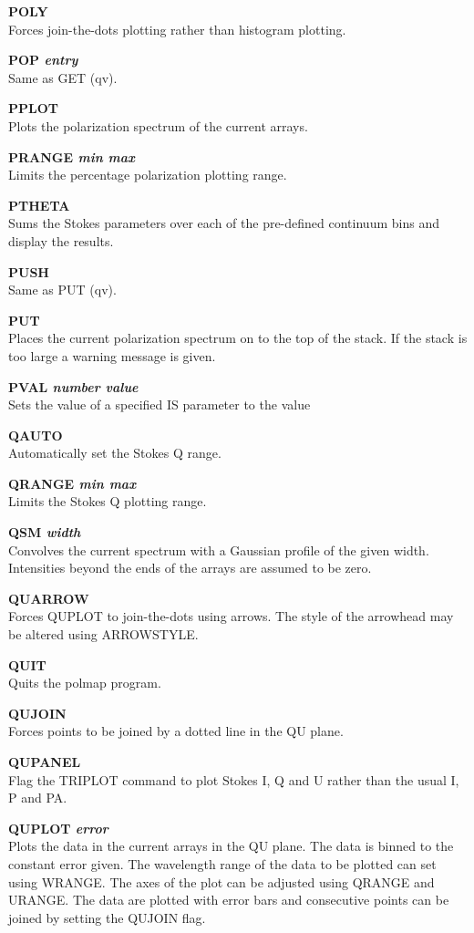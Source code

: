 {\bf POLY} \\
Forces join-the-dots plotting rather than histogram plotting.

{\bf POP \it  entry} \\
Same as GET (qv).

{\bf PPLOT} \\
Plots the polarization spectrum of the current arrays.

{\bf PRANGE \it min max } \\
Limits the percentage polarization plotting range.

{\bf PTHETA} \\
Sums the Stokes parameters over each of the pre-defined continuum bins and
display the results.

{\bf PUSH} \\
Same as PUT (qv).

{\bf PUT} \\
Places the current polarization spectrum on to the top of the stack. If the
stack is too large a warning message is given.

{\bf PVAL \it number value} \\
Sets the value of a specified IS parameter to the value

{\bf QAUTO} \\
Automatically set the Stokes Q range.

{\bf QRANGE \it min max } \\
Limits the Stokes Q  plotting range.

{\bf QSM \it width} \\
Convolves the current spectrum with a Gaussian profile of the given
width. Intensities beyond the ends of the arrays are assumed to be zero.

{\bf QUARROW} \\
Forces QUPLOT to join-the-dots using arrows. The style of the
arrowhead may be altered using ARROWSTYLE.

{\bf QUIT} \\
Quits the  polmap program.

{\bf QUJOIN} \\
Forces points to be joined by a dotted line in the QU plane.

{\bf QUPANEL} \\
Flag the TRIPLOT command to plot Stokes I, Q and U rather than the
usual I, P and PA.

{\bf QUPLOT \it error } \\
Plots the data in the current arrays in the QU plane. The data is
binned to the constant error given. The wavelength range of the data
to be plotted can set using WRANGE. The axes of the plot can be
adjusted using QRANGE and URANGE. The data are plotted with error bars
and consecutive points can be joined by setting the QUJOIN flag.


